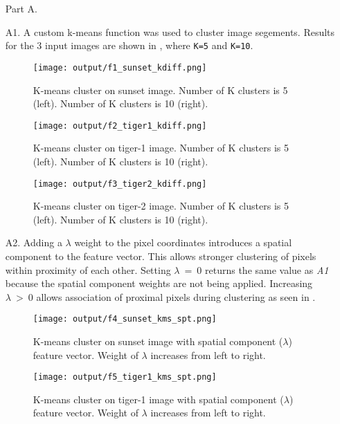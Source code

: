 \documentclass[12pt]{report}
\begin{document}
\begin{enumerate}

    \item[Part A.]
    \item[A1.]  A custom k-means function was used to cluster image segements. Results for the 3 input images are shown in , 
    where \verb|K=5| and \verb|K=10|.

    \begin{figure}[H]
        \centering
        \texttt{[image: output/f1\_sunset\_kdiff.png]}
        \caption{K-means cluster on sunset image. Number of K clusters is 5 (left). Number of K clusters is 10 (right).}
        \label{fig:Figure1}
    \end{figure}

    \begin{figure}[H]
        \centering
        \texttt{[image: output/f2\_tiger1\_kdiff.png]}
        \caption{K-means cluster on tiger-1 image. Number of K clusters is 5 (left). Number of K clusters is 10 (right).}
        \label{fig:Figure2}
    \end{figure}

    \begin{figure}[H]
        \centering
        \texttt{[image: output/f3\_tiger2\_kdiff.png]}
        \caption{K-means cluster on tiger-2 image. Number of K clusters is 5 (left). Number of K clusters is 10 (right).}
        \label{fig:Figure3}
    \end{figure}


    \item[A2.] Adding a $\lambda$ weight to the pixel coordinates introduces a spatial component to the feature vector. This allows stronger clustering of pixels 
    within proximity of each other. Setting $\lambda \ = \ 0$ returns the same value as \textit{A1} because the spatial component weights are not being applied. Increasing 
    $\lambda \ > \ 0$ allows association of proximal pixels during clustering as seen in .

    \begin{figure}[H]
        \centering
        \texttt{[image: output/f4\_sunset\_kms\_spt.png]}
        \caption{K-means cluster on sunset image with spatial component ($\lambda$) feature vector. Weight of $\lambda$ increases from left to right.}
        \label{fig:Figure4}
    \end{figure}

    \begin{figure}[H]
        \centering
        \texttt{[image: output/f5\_tiger1\_kms\_spt.png]}
        \caption{K-means cluster on tiger-1 image with spatial component ($\lambda$) feature vector. Weight of $\lambda$ increases from left to right.}
        \label{fig:Figure5}
    \end{figure}


\end{enumerate}
\end{document}
